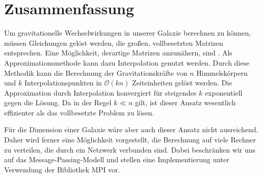 \chapter*{Zusammenfassung}
  Um gravitationelle Wechselwirkungen in unserer Galaxie berechnen zu können, müssen Gleichungen gelöst werden, die großen, vollbesetzten Matrizen entsprechen. Eine Möglichkeit, derartige Matrizen
  anzunähern, sind \hquad. Als Approximationsmethode kann dazu Interpolation genutzt werden. Durch diese Methodik kann die Berechnung der Gravitationskräfte von $n$ Himmelskörpern und $k$ 
  Interpolationspunkten in $\mathcal{O}(kn)$ Zeiteinheiten gelöst werden. Die Approximation durch Interpolation konvergiert für steigendes $k$ exponentiell gegen die Lösung. 
  Da in der Regel $k \ll n$ gilt, ist dieser Ansatz wesentlich effizienter als das vollbesetzte Problem zu lösen.
  
  Für die Dimension einer Galaxie wäre aber auch dieser Ansatz nicht ausreichend. Daher wird ferner eine Möglichkeit vorgestellt, die Berechnung auf viele Rechner zu verteilen, die durch ein 
  Netzwerk verbunden sind. Dabei beschränken wir uns auf das Message-Passing-Modell und stellen eine Implementierung unter Verwendung der Bibliothek MPI vor.
  
